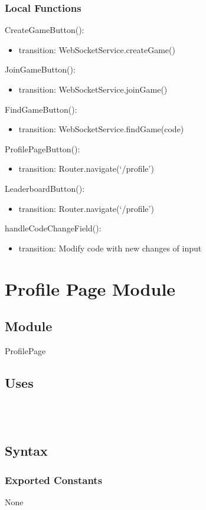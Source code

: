 \documentclass[12pt, titlepage]{article}
\begin{document}
\subsubsection{Local Functions}
\noindent CreateGameButton(): 
\begin{itemize}
\item transition: WebSocketService.createGame()
\end{itemize}
\noindent JoinGameButton():
\begin{itemize}
\item transition: WebSocketService.joinGame()
\end{itemize}
\noindent FindGameButton():
\begin{itemize}
\item transition: WebSocketService.findGame(code)
\end{itemize}
\noindent ProfilePageButton():
\begin{itemize}
\item transition: Router.navigate(`/profile')
\end{itemize}
\noindent LeaderboardButton():
\begin{itemize}
\item transition: Router.navigate(`/profile')
\end{itemize}
\noindent handleCodeChangeField():
\begin{itemize}
\item transition: Modify code with new changes of input
\end{itemize}
\newpage



\section{Profile Page Module} \label{ProfilePage} 
\subsection{Module}
ProfilePage
\subsection{Uses}
\\
 \\

\subsection{Syntax}
\subsubsection{Exported Constants}
None
\end{document}

